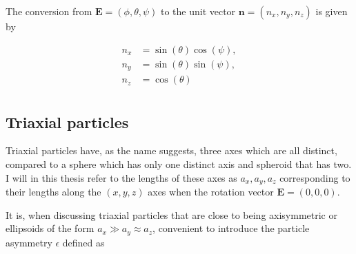 The conversion from $\mathbf{E} = (\phi, \theta, \psi)$ to the unit vector $\mathbf{n} = (n_x, n_y, n_z)$ is given by 

\begin{subequations}\label{eq:nzEq}
\begin{align}
n_x 	&= \sin(\theta)\cos(\psi), \\
n_y 	&= \sin(\theta)\sin(\psi),\\
n_z		&= \cos(\theta)\\\
\end{align}
\end{subequations}
%
%


\subsection{Triaxial particles}
Triaxial particles have, as the name suggests, three axes which are all distinct, compared to a sphere which has only one distinct axis and spheroid that has two. I will in this thesis refer to the lengths of these axes as $a_x, a_y, a_z$ corresponding to their lengths along the $(x,y,z)$ axes when the rotation vector $\mathbf{E} = (0,0,0)$. 

It is, when discussing triaxial particles that are close to being axisymmetric or ellipsoids of the form $a_x \gg a_y \approx a_z$, convenient to introduce the particle asymmetry $\epsilon$ defined as

